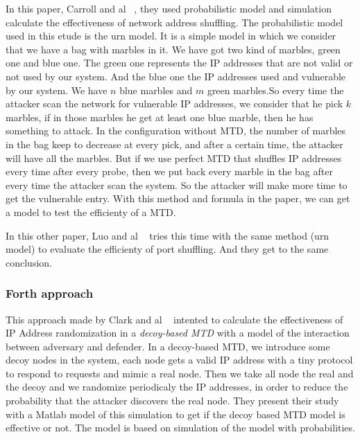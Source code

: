 In this paper, Carroll and al ~\cite{carroll_2014}, they used probabilistic
model and simulation calculate the effectiveness of network address
shuffling. \newline The probabilistic model used in this etude is the
urn model. It is a simple model in which we consider that we have a
bag with marbles in it. We have got two kind of marbles, green one and
blue one. The green one represents the IP addresses that are not valid
or not used by our system. And the blue one the IP addresses used and
vulnerable by our system. We have $n$ blue marbles and $m$ green
marbles.\newline So every time the attacker scan the network for
vulnerable IP addresses, we consider that he pick $k$ marbles, if in
those marbles he get at least one blue marble, then he has something
to attack. In the configuration without MTD, the number of marbles in
the bag keep to decrease at every pick, and after a certain time, the
attacker will have all the marbles. But if we use perfect MTD that
shuffles IP addresses every time after every probe, then we put back
every marble in the bag after every time the attacker scan the
system. So the attacker will make more time to get the vulnerable
entry. With this method and formula in the paper, we can get a model
to test the efficienty of a MTD.

In this other paper, Luo and al ~\cite{luo_2014} tries this time with the
same method (urn model) to evaluate the efficienty of port
shuffling. And they get to the same conclusion.


\subsubsection{ Forth approach}

This approach made by Clark and al ~\cite{clark_2013} intented to calculate
the effectiveness of IP Address randomization in a \emph{decoy-based MTD}
with a model of the interaction between adversary and defender.
\newline In a decoy-based MTD, we introduce some decoy nodes in the
system, each node gets a valid IP address with a tiny protocol to respond
to requests and mimic a real node. Then we take all node the real
and the decoy and we randomize periodicaly the IP addresses, in order
to reduce the probability that the attacker discovers the real
node. They present their study with a Matlab model of this simulation
to get if the decoy based MTD model is effective or not. The model is
based on simulation of the model with probabilities.


